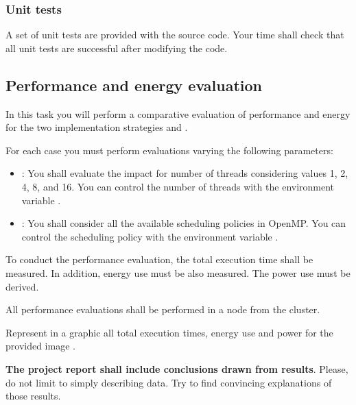 \subsubsection{Unit tests}

A set of unit tests are provided with the source code.
Your time shall check that all unit tests are successful after modifying the code.

\subsection{Performance and energy evaluation}

In this task you will perform a comparative evaluation of performance and energy
for the two implementation strategies  and .

For each case you must perform evaluations varying the following parameters:
\begin{itemize}
  \item {}: 
        You shall evaluate the impact for number of threads considering values 1, 2, 4, 8, and 16.
        You can control the number of threads with the environment variable
        .

  \item {}: 
        You shall consider all the available scheduling policies in OpenMP.
        You can control the scheduling policy with the environment variable
        .
      
\end{itemize}

To conduct the performance evaluation, the total execution time shall be measured.
In addition, energy use must be also measured.
The power use must be derived.

All performance evaluations shall be performed in a node from the
 cluster.

Represent in a graphic all total execution times, energy use and power
for the provided image .

\textbf{The project report shall include conclusions drawn from results}.
Please, do not limit to simply describing data.
Try to find convincing explanations of those results.
